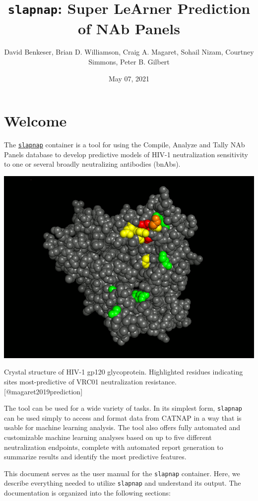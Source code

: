 \documentclass[]{article}
\title{\texttt{slapnap}: Super LeArner Prediction of NAb Panels}
\author{David Benkeser, Brian D. Williamson, Craig A. Magaret, Sohail Nizam,
Courtney Simmons, Peter B. Gilbert}
\date{May 07, 2021}
\begin{document}
\maketitle

{
\setcounter{tocdepth}{2}
\tableofcontents
}
\section*{Welcome}\label{welcome}

The \href{https://hub.docker.com/r/slapnap/slapnap}{\texttt{slapnap}}
container is a tool for using the Compile, Analyze and Tally NAb Panels
\citep[CATNAP;][]{yoon2015catnap} database to develop predictive models
of HIV-1 neutralization sensitivity to one or several broadly
neutralizing antibodies (bnAbs).

\begin{center}\includegraphics[width=0.7\linewidth]{gp120} \end{center}\begin{center}
Crystal structure of HIV-1 gp120 glycoprotein. Highlighted residues
indicating sites most-predictive of VRC01 neutralization resistance.
{[}@magaret2019prediction{]}
\end{center}

The tool can be used for a wide variety of tasks. In its simplest form,
\texttt{slapnap} can be used simply to access and format data from
CATNAP in a way that is usable for machine learning analysis. The tool
also offers fully automated and customizable machine learning analyses
based on up to five different neutralization endpoints, complete with
automated report generation to summarize results and identify the most
predictive features.

This document serves as the user manual for the \texttt{slapnap}
container. Here, we describe everything needed to utilize
\texttt{slapnap} and understand its output. The documentation is
organized into the following sections:
\end{document}
